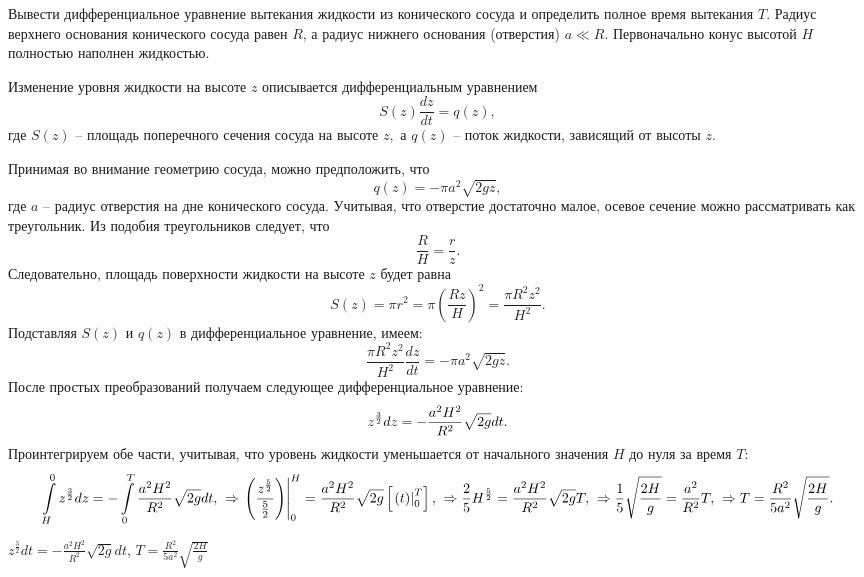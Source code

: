 \begin{ex}
Вывести дифференциальное уравнение вытекания жидкости из конического сосуда и определить полное время вытекания $T$. Радиус верхнего основания конического сосуда равен $R$, а радиус нижнего основания (отверстия) $a \ll R$. Первоначально конус высотой $H$ полностью наполнен жидкостью.
\begin{sol}
Изменение уровня жидкости на высоте \(z\) описывается дифференциальным уравнением
\[S\left( z \right)\frac{{dz}}{{dt}} = q\left( z \right),\]
где \(S\left( z \right)\) -- площадь поперечного сечения сосуда на высоте \(z,\) а \(q\left( z \right)\) -- поток жидкости, зависящий от высоты $z$.

Принимая во внимание геометрию сосуда, можно предположить, что \[q\left( z \right) =  - \pi {a^2}\sqrt {2gz} ,\] где \(a\) -- радиус отверстия на дне конического сосуда. Учитывая, что отверстие достаточно малое, осевое сечение можно рассматривать как треугольник. Из подобия треугольников следует, что \[\frac{R}{H} = \frac{r}{z}.\] Следовательно, площадь поверхности жидкости на высоте \(z\) будет равна
\[
{S\left( z \right) = \pi {r^2} }
= {\pi {\left( {\frac{{Rz}}{H}} \right)^2} }
= {\frac{{\pi {R^2}{z^2}}}{{{H^2}}}.}
\]
Подставляя \(S\left( z \right)\) и \(q\left( z \right)\) в дифференциальное уравнение, имеем:
\[\frac{{\pi {R^2}{z^2}}}{{{H^2}}}\frac{{dz}}{{dt}} =  - \pi {a^2}\sqrt {2gz} .\]
После простых преобразований получаем следующее дифференциальное уравнение:
\[{z^{\large\frac{3}{2}\normalsize}}dz =  - \frac{{{a^2}{H^2}}}{{{R^2}}}\sqrt {2g} dt.\]
Проинтегрируем обе части, учитывая, что уровень жидкости уменьшается от начального значения \(H\) до нуля за время \(T:\)
\[
{\int\limits_H^0 {{z^{\large\frac{3}{2}\normalsize}}dz}  =  - \int\limits_0^T {\frac{{{a^2}{H^2}}}{{{R^2}}}\sqrt {2g} dt} ,}\;\; 
{\Rightarrow \left. {\left( {\frac{{{z^{\large\frac{5}{2}\normalsize}}}}{{\frac{5}{2}}}} \right)} \right|_0^H = \frac{{{a^2}{H^2}}}{{{R^2}}}\sqrt {2g} \left[ {\left. {\left( t \right)} \right|_0^T} \right],}\;\; 
{\Rightarrow \frac{2}{5}{H^{\large\frac{5}{2}\normalsize}} = \frac{{{a^2}{H^2}}}{{{R^2}}}\sqrt {2g} T,}\;\; 
{\Rightarrow \frac{1}{5}\sqrt {\frac{{2H}}{g}}  = \frac{{{a^2}}}{{{R^2}}}T,}\;\; 
{\Rightarrow T = \frac{{{R^2}}}{{5{a^2}}}\sqrt {\frac{{2H}}{g}} .}
\]
\end{sol}
\begin{ans}
$z^{\frac{3}{2}}dt = - \frac{a^2H^2}{R^2}\sqrt{2g}dt$, $T = \frac{R^2}{5a^2}\sqrt{\frac{2H}{g}}$
\end{ans}
\end{ex}

